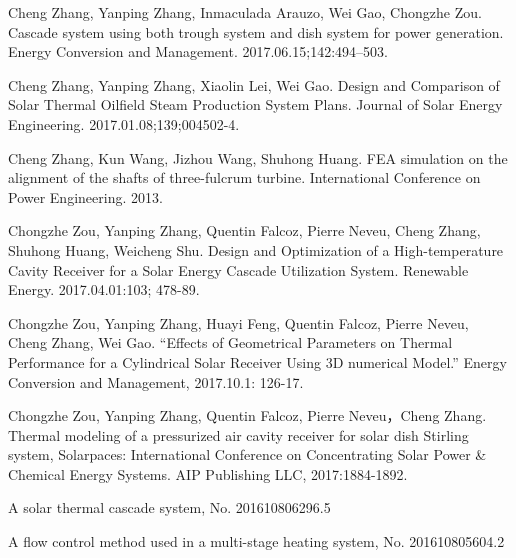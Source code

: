 \begin{publications}
  \item Cheng Zhang, Yanping Zhang, Inmaculada Arauzo, Wei Gao, Chongzhe  Zou. Cascade system using both trough system and dish system for power generation. Energy Conversion and Management. 2017.06.15;142:494–503.
  \item Cheng Zhang, Yanping Zhang, Xiaolin Lei, Wei Gao. Design and Comparison of Solar Thermal Oilfield Steam Production System Plans. Journal of Solar Energy Engineering. 2017.01.08;139;004502-4.
  \item Cheng Zhang, Kun Wang, Jizhou Wang, Shuhong Huang. FEA simulation on the alignment of the shafts of three-fulcrum turbine. International Conference on Power Engineering. 2013.
  \item Chongzhe Zou, Yanping Zhang, Quentin Falcoz, Pierre Neveu, Cheng Zhang, Shuhong Huang, Weicheng Shu. Design and Optimization of a High-temperature Cavity Receiver for a Solar Energy Cascade Utilization System. Renewable Energy. 2017.04.01:103; 478-89. 
	\item Chongzhe Zou, Yanping Zhang, Huayi Feng, Quentin Falcoz, Pierre Neveu, Cheng Zhang, Wei Gao. “Effects of Geometrical Parameters on Thermal Performance for a Cylindrical Solar Receiver Using 3D numerical Model.” Energy Conversion and Management, 2017.10.1: 126-17.
  \item Chongzhe Zou, Yanping Zhang, Quentin Falcoz, Pierre Neveu，Cheng Zhang. Thermal modeling of a pressurized air cavity receiver for solar dish Stirling system, Solarpaces: International Conference on Concentrating Solar Power \& Chemical Energy Systems. AIP Publishing LLC, 2017:1884-1892.
  
  \item A solar thermal cascade system, No. 201610806296.5
  \item A flow control method used in a multi-stage heating system, No. 201610805604.2
  
\end{publications}